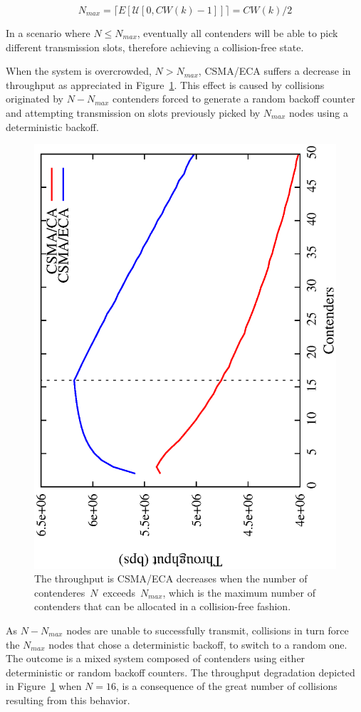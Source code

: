 \begin{equation} \label{eq:capacity}	
	N_{max} = \lceil{E[\mathcal{U}[0, CW(k) - 1]]}\rceil = CW(k)/2
\end{equation}

In a scenario where $N \leq N_{max}$, eventually all contenders will be able to pick different transmission slots, therefore achieving a collision-free state.

When the system is overcrowded, $N>N_{max}$, CSMA/ECA suffers a decrease in throughput as appreciated in Figure~\ref{fig:throughput}. This effect is caused by collisions originated by $N-N_{max}$ contenders forced to generate a random backoff counter and attempting transmission on slots previously picked by $N_{max}$ nodes using a deterministic backoff.


\begin{figure}[htbp]
  \centering
  \includegraphics[width=0.7\linewidth, angle = -90]{figures/throughput/throughput.eps}
  \caption{The throughput is CSMA/ECA decreases when the number of contenderes~$N$~exceeds~$N_{max}$, which is the maximum number of contenders that can be allocated in a collision-free fashion.
  \label{fig:throughput}}
\end{figure}

As $N-N_{max}$ nodes are unable to successfully transmit, collisions in turn force the $N_{max}$ nodes that chose a deterministic backoff, to switch to a random one. The outcome is a mixed system composed of contenders using either deterministic or random backoff counters. The throughput degradation depicted in Figure~\ref{fig:throughput} when $N=16$, is a consequence of the great number of collisions resulting from this behavior.

